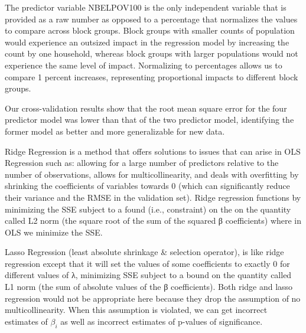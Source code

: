 \documentclass[
]{article}
\begin{document}
The predictor variable NBELPOV100 is the only independent variable that
is provided as a raw number as opposed to a percentage that normalizes
the values to compare across block groups. Block groups with smaller
counts of population would experience an outsized impact in the
regression model by increasing the count by one household, whereas block
groups with larger populations would not experience the same level of
impact. Normalizing to percentages allows us to compare 1 percent
increases, representing proportional impacts to different block groups.

Our cross-validation results show that the root mean square error for
the four predictor model was lower than that of the two predictor model,
identifying the former model as better and more generalizable for new
data.

Ridge Regression is a method that offers solutions to issues that can
arise in OLS Regression such as: allowing for a large number of
predictors relative to the number of observations, allows for
multicollinearity, and deals with overfitting by shrinking the
coefficients of variables towards 0 (which can significantly reduce
their variance and the RMSE in the validation set). Ridge regression
functions by minimizing the SSE subject to a found (i.e., constraint) on
the on the quantity called L2 norm (the square root of the sum of the
squared β coefficients) where in OLS we minimize the SSE.

Lasso Regression (least absolute shrinkage \& selection operator), is
like ridge regression except that it will set the values of some
coefficients to exactly 0 for different values of λ, minimizing SSE
subject to a bound on the quantity called L1 norm (the sum of absolute
values of the β coefficients). Both ridge and lasso regression would not
be appropriate here because they drop the assumption of no
multicollinearity. When this assumption is violated, we can get
incorrect estimates of \(β_i\) as well as incorrect estimates of
p-values of significance.
\end{document}
